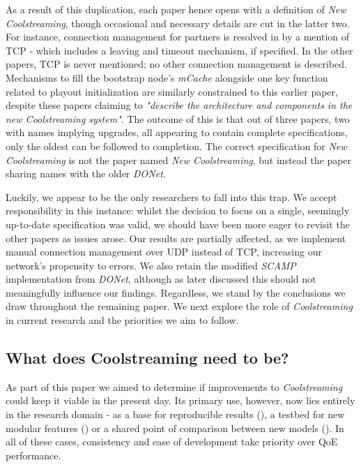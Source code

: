 \documentclass[12pt,a4paper]{article}
\begin{document}
As a result of this duplication, each paper hence opens with a definition of \textit{New Coolstreaming}, though occasional and necessary details are cut in the latter two. For instance, connection management for partners is resolved in \cite{Xie2007} by a mention of TCP - which includes a leaving and timeout mechanism, if specified. In the other papers, TCP is never mentioned; no other connection management is described. Mechanisms to fill the bootstrap node's \textit{mCache} alongside one key function related to playout initialization are similarly constrained to this earlier paper, despite these papers claiming to \textit{"describe the architecture and components in the new Coolstreaming system"}. The outcome of this is that out of three papers, two with names implying upgrades, all appearing to contain complete specifications, only the oldest can be followed to completion. The correct specification for \textit{New Coolstreaming} is not the paper named \textit{New Coolstreaming}, but instead the paper sharing names with the older \textit{DONet}.

Luckily, we appear to be the only researchers to fall into this trap. We accept responsibility in this instance: whilst the decision to focus on a single, seemingly up-to-date specification was valid, we should have been more eager to revisit the other papers as issues arose. Our results are partially affected, as we implement manual connection management over UDP instead of TCP, increasing our network's propensity to errors. We also retain the modified \textit{SCAMP} implementation from \textit{DONet}, although as later discussed this should not meaningfully influence our findings. Regardless, we stand by the conclusions we draw throughout the remaining paper. We next explore the role of \textit{Coolstreaming} in current research and the priorities we aim to follow.

\subsection{What does Coolstreaming need to be?} \label{problems:what}
As part of this paper we aimed to determine if improvements to \textit{Coolstreaming} could keep it viable in the present day. Its primary use, however, now lies entirely in the research domain - as a base for reproducible results (\cite{Liu2010}), a testbed for new modular features (\cite{Ho2014}) or a shared point of comparison between new models (\cite{Pal2017}). In all of these cases, consistency and ease of development take priority over QoE performance.
\end{document}
